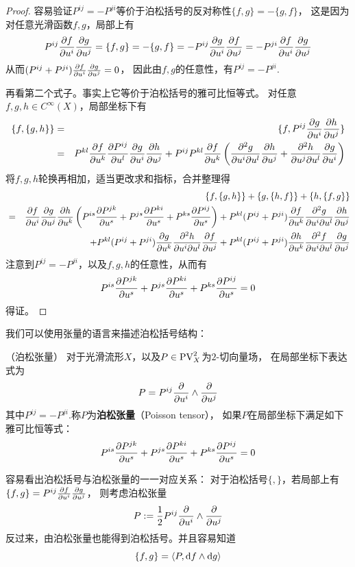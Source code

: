 \begin{proof}
容易验证$P^{ij}=-P^{ji}$等价于泊松括号的反对称性$\{f,g\}=-\{g,f\}$，
这是因为对任意光滑函数$f,g$，局部上有
$$P^{ij}\frac{\partial f} {\partial u^i}\frac{\partial g} {\partial u^j}=\{f,g\}=-\{g,f\}
=-P^{ij}\frac{\partial g} {\partial u^i}\frac{\partial f} {\partial u^j}=
-P^{ji}\frac{\partial f} {\partial u^i}\frac{\partial g} {\partial u^j}$$
从而$(P^{ij}+P^{ji})\frac{\partial f} {\partial u^i}\frac{\partial g} {\partial u^j}=0$，
因此由$f,g$的任意性，有$P^{ij}=-P^{ji}$.\vs

再看第二个式子。事实上它等价于泊松括号的雅可比恒等式。
对任意$f,g,h\in C^{\infty}(X)$，局部坐标下有
\begin{eqnarray*}
     \{f,\{g,h\}\}
&=&
     \{f,P^{ij}\frac{\partial g} {\partial u^i}\frac{\partial h} {\partial u^j}\}\\
&=&
     P^{kl}\frac{\partial f} {\partial u^k}
     \frac{\partial P^{ij}} {\partial u^l}
     \frac{\partial g} {\partial u^i}
     \frac{\partial h} {\partial u^j}
    +P^{ij}P^{kl}\frac{\partial f} {\partial u^k}
     \left(
       \frac{\partial^2{g}} {\partial{u^i}\partial{u^l}}\frac{\partial h} {\partial u^j}
      +\frac{\partial^2{h}} {\partial{u^j}\partial{u^l}}\frac{\partial g} {\partial u^i}
     \right)
\end{eqnarray*}
将$f,g,h$轮换再相加，适当更改求和指标，合并整理得
\begin{eqnarray*}
& &
     \{f,\{g,h\}\}+\{g,\{h,f\}\}+\{h,\{f,g\}\}\\
&=&
     \frac{\partial f} {\partial u^i}
     \frac{\partial g} {\partial u^j}
     \frac{\partial h} {\partial u^k}
     \left(
       P^{is}\frac{\partial P^{jk}} {\partial u^s}
      +P^{js}\frac{\partial P^{ki}} {\partial u^s}
      +P^{ks}\frac{\partial P^{ij}} {\partial u^s}
     \right)
    +P^{kl}(P^{ij}+P^{ji})
     \frac{\partial f} {\partial u^k}
     \frac{\partial^2{g}} {\partial{u^i}\partial{u^l}}
     \frac{\partial h} {\partial u^j}\\
& &
    +P^{kl}(P^{ij}+P^{ji})
     \frac{\partial g} {\partial u^k}
     \frac{\partial^2{h}} {\partial{u^i}\partial{u^l}}
     \frac{\partial f} {\partial u^j}
    +P^{kl}(P^{ij}+P^{ji})
     \frac{\partial h} {\partial u^k}
     \frac{\partial^2{f}} {\partial{u^i}\partial{u^l}}
     \frac{\partial g} {\partial u^j}
\end{eqnarray*}
注意到$P^{ij}=-P^{ji}$，以及$f,g,h$的任意性，从而有
$$
 P^{is}\frac{\partial P^{jk}} {\partial u^s}
+P^{js}\frac{\partial P^{ki}} {\partial u^s}
+P^{ks}\frac{\partial P^{ij}} {\partial u^s}
=0
$$
得证。
\end{proof}

我们可以使用张量的语言来描述泊松括号结构：

\begin{definition}（泊松张量）
对于光滑流形$X$，以及$P\in\operatorname{PV}^2_X$为$2$-切向量场，
在局部坐标下表达式为
$$P=P^{ij}\frac{\partial } {\partial u^i}\wedge\frac{\partial } {\partial u^j}$$
其中$P^{ij}=-P^{ji}$.称$P$为\textbf{泊松张量}（Poisson tensor），
如果$P$在局部坐标下满足如下雅可比恒等式：
$$
 P^{is}\frac{\partial P^{jk}} {\partial u^s}
+P^{js}\frac{\partial P^{ki}} {\partial u^s}
+P^{ks}\frac{\partial P^{ij}} {\partial u^s}
=0
$$
\end{definition}
容易看出泊松括号与泊松张量的一一对应关系：
对于泊松括号$\{,\}$，若局部上有
$\{f,g\}=P^{ij}\frac{\partial f} {\partial u^i}\frac{\partial g} {\partial u^j}$，
则考虑泊松张量
$$P:=\frac{1}{2}P^{ij}\frac{\partial } {\partial u^i}\wedge\frac{\partial } {\partial u^j}$$
反过来，由泊松张量也能得到泊松括号。并且容易知道
$$\{f,g\}=\langle P,\mathrm{d} f\wedge\mathrm{d} g\rangle$$

